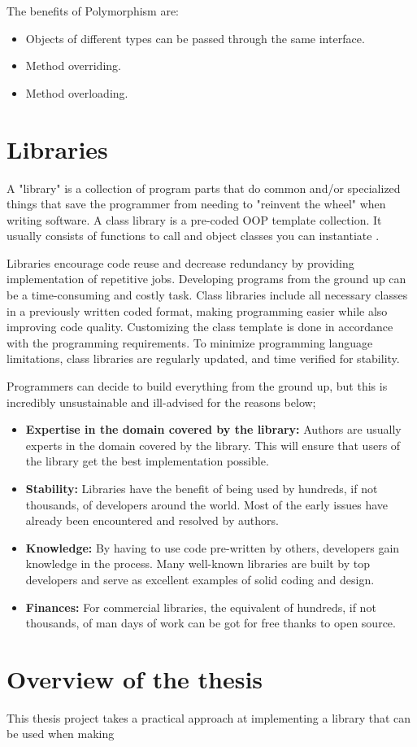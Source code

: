 The benefits of Polymorphism are:

\begin{itemize}
  \item Objects of different types can be passed through the same interface.
  \item Method overriding.
  \item Method overloading.
\end{itemize}

\section{Libraries}
A "library" is a collection of program parts that do common and/or specialized things that save the programmer from needing to "reinvent the wheel" when writing software. A class library is a pre-coded OOP template collection. It usually consists of functions to call and object classes you can instantiate \cite{stevenparker}.

Libraries encourage code reuse and decrease redundancy by providing implementation of repetitive jobs.  Developing programs from the ground up can be a time-consuming and costly task. Class libraries include all necessary classes in a previously written coded format, making programming easier while also improving code quality. Customizing the class template is done in accordance with the programming requirements. To minimize programming language limitations, class libraries are regularly updated, and time verified for stability.

Programmers can decide to build everything from the ground up, but this is incredibly unsustainable and ill-advised for the reasons below;

\begin{itemize}
  \item \textbf{Expertise in the domain covered by the library:} Authors are usually experts in the domain covered by the library. This will ensure that users of the library get the best implementation possible.
  \item \textbf{Stability:} Libraries have the benefit of being used by hundreds, if not thousands, of developers around the world. Most of the early issues have already been encountered and resolved by authors.
  \item \textbf{Knowledge:} By having to use code pre-written by others, developers gain knowledge in the process. Many well-known libraries are built by top developers and serve as excellent examples of solid coding and design.
  \item \textbf{Finances:} For commercial libraries, the equivalent of hundreds, if not thousands, of man days of work can be got for free thanks to open source.
\end{itemize}

\section{Overview of the thesis}
This thesis project takes a practical approach at implementing a library that can be used when making